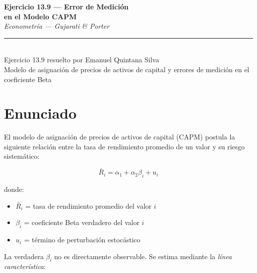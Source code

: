 \documentclass[12pt,letterpaper]{article}
\begin{document}

\begin{center}

{\LARGE\bfseries Ejercicio 13.9 --- Error de Medición}\\[4pt]

{\LARGE\bfseries en el Modelo CAPM}\\[12pt]

{\large\itshape Econometría --- Gujarati \& Porter}\\[10pt]

\rule{0.55\linewidth}{0.6pt}\\[10pt]

{\normalsize
Ejercicio 13.9 resuelto por Emanuel Quintana Silva}\\[4pt]

{\small
Modelo de asignación de precios de activos de capital
y errores de medición en el coeficiente Beta}

\end{center}

\vspace{12pt}

\section{Enunciado}

El modelo de asignación de precios de activos de capital (CAPM) postula
la siguiente relación entre la tasa de rendimiento promedio de un valor
y su riesgo sistemático:

\begin{equation}
\bar{R}_{i} = \alpha_{1} + \alpha_{2}\beta_{i} + u_{i}
\end{equation}

donde:

\begin{itemize}
\item $\bar{R}_{i}$ = tasa de rendimiento promedio del valor $i$
\item $\beta_{i}$ = coeficiente Beta verdadero del valor $i$
\item $u_{i}$ = término de perturbación estocástico
\end{itemize}

La verdadera $\beta_{i}$ no es directamente observable. Se estima
mediante la \emph{línea característica}:
\end{document}
